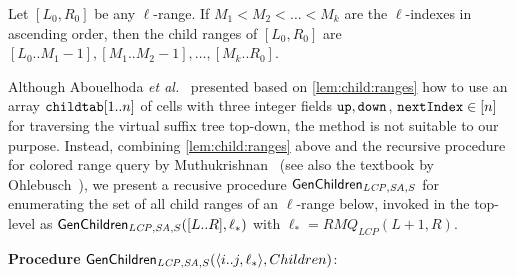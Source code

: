 \begin{lemma}\label{lem:child:ranges}
  Let $[L_0, R_0]$ be any $\ell$-range.
  If $M_1 < M_2 < \dots < M_k$ are the $\ell$-indexes in ascending order, then the child ranges of $[L_0, R_0]$ are
  $[L_0..M_1-1], 
   [M_1..M_2-1], 
   \ldots,
   [M_k..R_0]$.  
\end{lemma}

Although Abouelhoda \textit{et al.}~\cite{abouelhoda2004replacing} presented based on \cref{lem:child:ranges} how to use an array $\mathtt{childtab}[1..n]$ of cells with three integer fields $\mathtt{up}, \mathtt{down}$, $\mathtt{nextIndex} \in [n]$ for traversing the virtual suffix tree top-down, the method is not suitable to our purpose. 
Instead, combining \cref{lem:child:ranges} above and the recursive procedure for colored range query by Muthukrishnan~\cite{muthukrishnan2002efficient} (see also the textbook by Ohlebusch~\cite{ohlebusch2013bookbioinfo}), we present a recusive procedure $\textsf{GenChildren}_{{\mathit{LCP}, \mathit{SA}, S}}$ for enumerating the set of all child ranges of an $\ell$-range below, invoked in the top-level as $\textsf{GenChildren}_{{\mathit{LCP}, \mathit{SA}, S}}([L..R], \ell_*)$ with $\ell_* = RMQ_{LCP}(L+1, R)$. 

{
\setlength{\interspacetitleruled}{0pt}%
\setlength{\algotitleheightrule}{0pt}%
\begin{algorithm}[t]
  \caption{
    A recusive procedure that, based on precomputed arrays $\LCP, \SA, S$,  
    enumerates the set of all child ranges of an $\ell$-range.
  }\label{algo:branch:repeats}
  \textbf{Procedure} $\textsf{GenChildren}_{{\mathit{LCP}, \mathit{SA}, S}}(\langle i..j, \ell_*\rangle, Children)$:\\
\end{algorithm}
}

